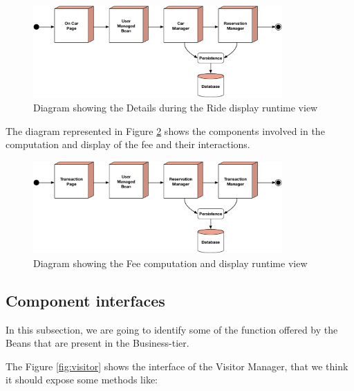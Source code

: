 \begin{figure}[htbp]
\centering
\vspace{104pt}
\includegraphics[width=0.85\textwidth]{Images/RideRun.pdf}
\vspace{10pt}
\caption{Diagram showing the Details during the Ride display runtime view}
\label{fig:ride}
\end{figure}
\clearpage

\newline
The diagram represented in Figure \ref{fig:fee} shows the components involved in the computation and display of the fee and their interactions.

\begin{figure}[htbp]
\centering
\vspace{104pt}
\includegraphics[width=0.85\textwidth]{Images/FeeRun.pdf}
\vspace{10pt}
\caption{Diagram showing the Fee computation and display runtime view}
\label{fig:fee}
\end{figure}
\clearpage

\subsection{Component interfaces} \label{comp-inter}
In this subsection, we are going to identify some of the function offered by the Beans that are present in the Business-tier.

\newline
The Figure \ref{fig:visitor} shows the interface of the Visitor Manager, that we think it should expose some methods like:

